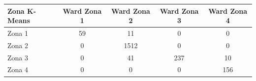 \begin{tabular}{lcccc}
\toprule
Zona K-Means & Ward Zona 1 & Ward Zona 2 & Ward Zona 3 & Ward Zona 4 \\
\midrule
Zona 1 & 59 & 11 & 0 & 0 \\
Zona 2 & 0 & 1512 & 0 & 0 \\
Zona 3 & 0 & 41 & 237 & 10 \\
Zona 4 & 0 & 0 & 0 & 156 \\
\bottomrule
\end{tabular}